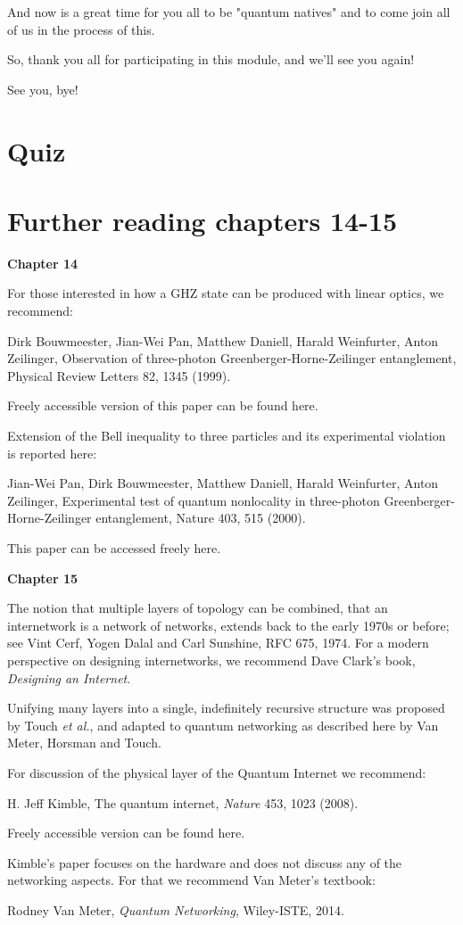 \rrr And now is a great time for you all to be "quantum natives" and to come join all of us in the process of this.

So, thank you all for participating in this module, and we'll see you again!

\mmm See you, bye!



\newpage
\section*{Quiz}


\section*{Further reading chapters 14-15}

{\bf Chapter 14}

For those interested in how a GHZ state can be produced with linear optics, we recommend:

Dirk Bouwmeester, Jian-Wei Pan, Matthew Daniell, Harald Weinfurter, Anton Zeilinger, Observation of three-photon Greenberger-Horne-Zeilinger entanglement, Physical Review Letters 82, 1345 (1999).

Freely accessible version of this paper can be found here.

Extension of the Bell inequality to three particles and its experimental violation is reported here:

Jian-Wei Pan, Dirk Bouwmeester, Matthew Daniell, Harald Weinfurter, Anton Zeilinger, Experimental test of quantum nonlocality in three-photon Greenberger-Horne-Zeilinger entanglement, Nature 403, 515 (2000).

This paper can be accessed freely here.

{\bf Chapter 15}

The notion that multiple layers of topology can be combined, that an internetwork is a network of networks, extends back to the early 1970s or before; see Vint Cerf, Yogen Dalal and Carl Sunshine, RFC 675, 1974.  For a modern perspective on designing internetworks, we recommend Dave Clark's book, \emph{Designing an Internet}.

Unifying many layers into a single, indefinitely recursive structure was proposed by Touch \emph{et al.}, and adapted to quantum networking as described here by Van Meter, Horsman and Touch.

For discussion of the physical layer of the Quantum Internet we recommend:

H. Jeff Kimble, The quantum internet, \emph{Nature} 453, 1023 (2008).

Freely accessible version can be found here.

Kimble’s paper focuses on the hardware and does not discuss any of the networking aspects. For that we recommend Van Meter’s textbook:

Rodney Van Meter, \emph{Quantum Networking}, Wiley-ISTE, 2014.
